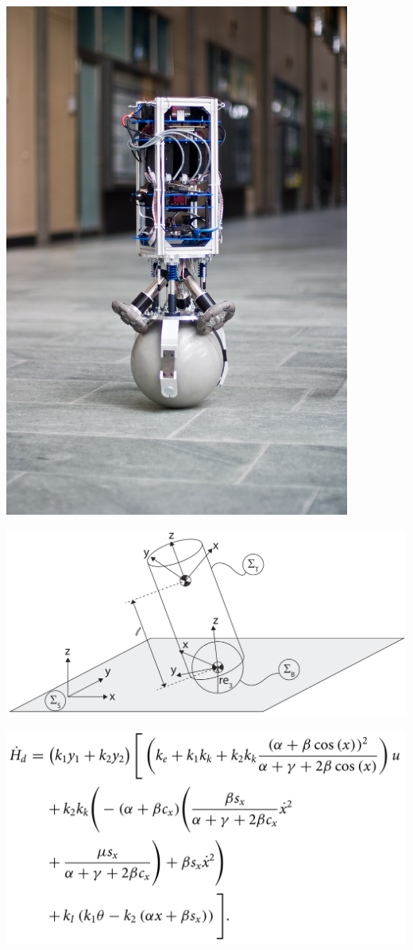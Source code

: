 \documentclass[
]{report}
\begin{document}
\includegraphics[width=\textwidth,height=6.66667in]{contents/assets/Ballbot_Rezero_2010.jpg}

\includegraphics[width=8.33333in,height=\textheight]{contents/assets/ballbot_schematic.png}

\includegraphics[width=8.33333in,height=\textheight]{contents/assets/ballbot_derivation_1.png}
\end{document}
